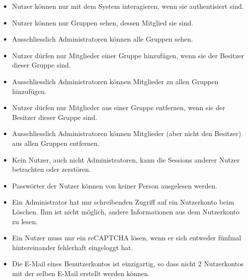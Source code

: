\documentclass[fontsize=12pt,DIV=14,BCOR=10mm,a4paper,parskip=half-,ngerman,english,bibliography=totocnumbered]{scrreprt}
\begin{document}
\begin{itemize}
  \item Nutzer können nur mit dem System interagieren, wenn sie authentisiert sind.
  \item Nutzer können nur Gruppen sehen, dessen Mitglied sie sind.
  \item Ausschliesslich Administratoren können alle Gruppen sehen.
  \item Nutzer dürfen nur Mitglieder einer Gruppe hinzufügen, wenn sie der Besitzer dieser Gruppe sind.
  \item Ausschliesslich Administratoren können Mitglieder zu allen Gruppen hinzufügen.
  \item Nutzer dürfen nur Mitglieder aus einer Gruppe entfernen, wenn sie der Besitzer dieser Gruppe sind.
  \item Ausschliesslich Administratoren können Mitglieder (aber nicht den Besitzer) aus allen Gruppen entfernen.
  \item Kein Nutzer, auch nicht Administratoren, kann die Sessions anderer Nutzer betrachten oder zerstören.
  \item Passwörter der Nutzer können von keiner Person ausgelesen werden.
  \item Ein Administrator hat nur schreibenden Zugriff auf ein Nutzerkonto beim Löschen. Ihm ist nicht möglich, andere Informationen aus dem Nutzerkonto zu lesen.
  \item Ein Nutzer muss nur ein reCAPTCHA lösen, wenn er sich entweder fünfmal hintereinander fehlerhaft eingeloggt hat.
  \item Die E-Mail eines Benutzerkontos ist einzigartig, so dass nicht 2 Nutzerkontos mit der selben E-Mail erstellt werden können.
\end{itemize}

\clearpage

\printbibliography

\printacronyms[title=Abkürzungsverzeichnis,toctitle=Abkürzungsverzeichnis]
\printglossary[type=main]

\end{document}
